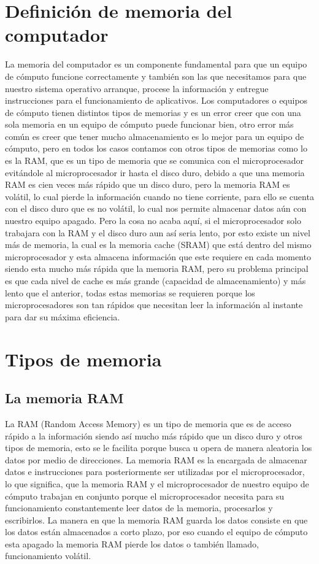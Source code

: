\documentclass{article}
\begin{document}
	\section{Definición de memoria del computador}
	La memoria del computador es un componente fundamental para que un equipo de cómputo funcione correctamente y también son las que necesitamos para que nuestro sistema operativo arranque, procese la información y entregue instrucciones para el funcionamiento de aplicativos. Los computadores o equipos de cómputo tienen distintos tipos de memorias y es un error creer que con una sola memoria en un equipo de cómputo puede funcionar bien, otro error más común es creer que tener mucho almacenamiento es lo mejor para un equipo de cómputo, pero en todos los casos contamos con otros tipos de memorias como lo es la RAM, que es un tipo de memoria que se comunica con el microprocesador evitándole al microprocesador ir hasta el disco duro, debido a que una memoria RAM es cien veces más rápido que un disco duro, pero la memoria RAM es volátil, lo cual pierde la información cuando no tiene corriente, para ello se cuenta con el disco duro que es no volátil, lo cual nos permite almacenar datos aún con nuestro equipo apagado. Pero la cosa no acaba aquí, si el microprocesador solo trabajara con la RAM y el disco duro aun así seria lento, por esto existe un nivel más de memoria, la cual es la memoria cache (SRAM) que está dentro del mismo microprocesador y esta almacena información que este requiere en cada momento siendo esta  mucho más rápida que la memoria RAM, pero su problema principal es que cada nivel de cache es más grande (capacidad de almacenamiento) y más lento que el anterior, todas estas memorias se requieren porque los microprocesadores son tan rápidos que necesitan leer la información al instante para dar su máxima eficiencia.
	
	\section{Tipos de memoria}
	\subsection{La memoria RAM}
	La RAM (Random Access Memory) es un tipo de memoria que es de acceso rápido a la información siendo así mucho más rápido que un disco duro y otros tipos de memoria, esto se le facilita porque busca u opera de manera aleatoria los datos por medio de direcciones. La memoria RAM es la encargada de almacenar datos e instrucciones para posteriormente ser utilizadas por el microprocesador, lo que significa, que la memoria RAM y el microprocesador de nuestro equipo de cómputo trabajan en conjunto porque el microprocesador necesita para su funcionamiento constantemente leer datos de la memoria, procesarlos y escribirlos. La manera en que la memoria RAM guarda los datos consiste en que los datos están almacenados a corto plazo, por eso cuando el equipo de cómputo esta apagado la memoria RAM pierde los datos o también llamado, funcionamiento volátil. \cite{MCwebsite}
	
\end{document}
